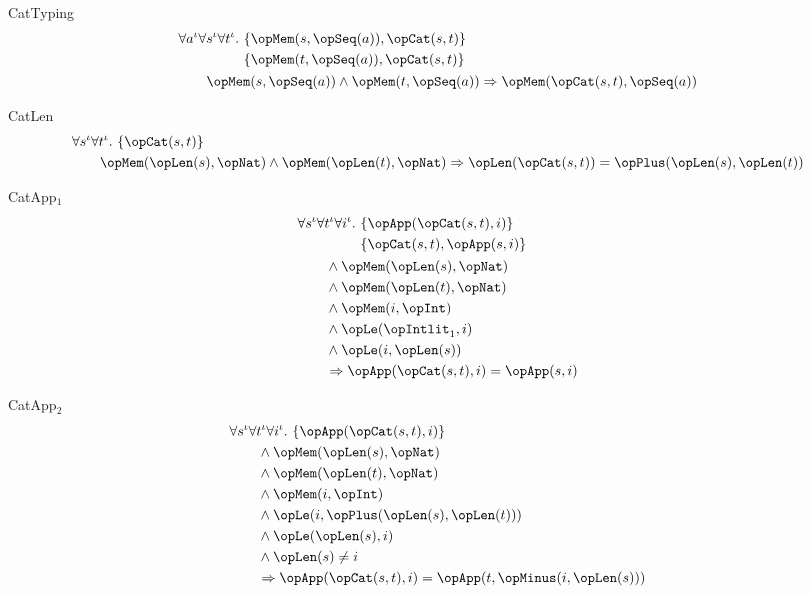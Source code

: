 \documentclass[11pt, a4paper, oneside]{article}
\begin{document}
\begin{axioms}
\item[CatTyping] \[
        \begin{aligned}
            &\forall a^\idv \forall s^\idv \forall t^\idv.\, \begin{aligned}[t]
                &\st{ \opMem(s, \opSeq(a)), \opCat(s, t) } \\
                &\st{ \opMem(t, \opSeq(a)), \opCat(s, t) }
            \end{aligned} \\
            &\qquad \opMem(s, \opSeq(a)) \wedge \opMem(t, \opSeq(a)) \imp \opMem(\opCat(s, t), \opSeq(a))
        \end{aligned}
    \]

\item[CatLen] \[
        \begin{aligned}
            &\forall s^\idv \forall t^\idv.\, \st{ \opCat(s, t) } \\
            &\qquad \opMem(\opLen(s), \opNat) \wedge \opMem(\opLen(t), \opNat) \imp \opLen(\opCat(s, t)) = \opPlus(\opLen(s), \opLen(t))
        \end{aligned}
    \]

\item[CatApp$_1$] \[
        \begin{aligned}
            &\forall s^\idv \forall t^\idv \forall i^\idv.\, \begin{aligned}[t]
                &\st{ \opApp(\opCat(s, t), i) } \\
                &\st{ \opCat(s, t), \opApp(s, i) }
            \end{aligned} \\
            &\qquad \wedge \opMem(\opLen(s), \opNat) \\
            &\qquad \wedge \opMem(\opLen(t), \opNat) \\
            &\qquad \wedge \opMem(i, \opInt) \\
            &\qquad \wedge \opLe(\opIntlit_1, i) \\
            &\qquad \wedge \opLe(i, \opLen(s)) \\
            &\qquad \imp \opApp(\opCat(s, t), i) = \opApp(s, i)
        \end{aligned}
    \]

\item[CatApp$_2$] \[
        \begin{aligned}
            &\forall s^\idv \forall t^\idv \forall i^\idv.\, \st{ \opApp(\opCat(s, t), i) } \\
            &\qquad \wedge \opMem(\opLen(s), \opNat) \\
            &\qquad \wedge \opMem(\opLen(t), \opNat) \\
            &\qquad \wedge \opMem(i, \opInt) \\
            &\qquad \wedge \opLe(i, \opPlus(\opLen(s), \opLen(t))) \\
            &\qquad \wedge \opLe(\opLen(s), i) \\
            &\qquad \wedge \opLen(s) \neq i \\
            &\qquad \imp \opApp(\opCat(s, t), i) = \opApp(t, \opMinus(i, \opLen(s)))
        \end{aligned}
    \]


\end{axioms}
\end{document}
